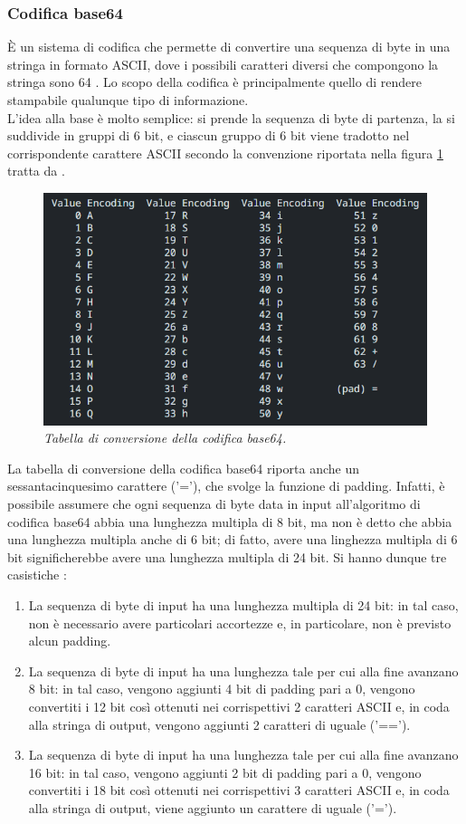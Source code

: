 \documentclass[10pt, oneside]{book}
\begin{document}
\subsubsection{Codifica base64}
È un sistema di codifica che permette di convertire una sequenza di byte in una stringa in formato ASCII, dove i possibili caratteri diversi che compongono la stringa sono 64 \cite{RFC-4648}. Lo scopo della codifica è principalmente quello di rendere stampabile qualunque tipo di informazione.\\
L'idea alla base è molto semplice: si prende la sequenza di byte di partenza, la si suddivide in gruppi di 6 bit, e ciascun gruppo di 6 bit viene tradotto nel corrispondente carattere ASCII secondo la convenzione riportata nella figura \ref{fig:base64} tratta da \cite{RFC-4648}.\\
\begin{figure}
\includegraphics[width=\linewidth]{base64.png}
\caption{\textit{Tabella di conversione della codifica base64.}}
\label{fig:base64}
\end{figure}
La tabella di conversione della codifica base64 riporta anche un sessantacinquesimo carattere ('='), che svolge la funzione di padding. Infatti, è possibile assumere che ogni sequenza di byte data in input all'algoritmo di codifica base64 abbia una lunghezza multipla di 8 bit, ma non è detto che abbia una lunghezza multipla anche di 6 bit; di fatto, avere una linghezza multipla di 6 bit significherebbe avere una lunghezza multipla di 24 bit. Si hanno dunque tre casistiche \cite{RFC-4648}:
\begin{enumerate}
\item La sequenza di byte di input ha una lunghezza multipla di 24 bit: in tal caso, non è necessario avere particolari accortezze e, in particolare, non è previsto alcun padding.
\item La sequenza di byte di input ha una lunghezza tale per cui alla fine avanzano 8 bit: in tal caso, vengono aggiunti 4 bit di padding pari a 0, vengono convertiti i 12 bit così ottenuti nei corrispettivi 2 caratteri ASCII e, in coda alla stringa di output, vengono aggiunti 2 caratteri di uguale ('==').
\item La sequenza di byte di input ha una lunghezza tale per cui alla fine avanzano 16 bit: in tal caso, vengono aggiunti 2 bit di padding pari a 0, vengono convertiti i 18 bit così ottenuti nei corrispettivi 3 caratteri ASCII e, in coda alla stringa di output, viene aggiunto un carattere di uguale ('=').
\end{enumerate}
\end{document}
